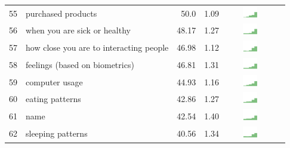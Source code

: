 \begin{table}[t]
\begin{center}
\begin{tabular}{| r | l | r | r | r | r |}
55 & purchased products & 50.0 & 1.09 & \includegraphics[width = 2cm, height = 0.5cm]{tex-inputs/table-images/learnedwhatproductsyoubuycombined} \\ 
56 & when you are sick or healthy & 48.17  & 1.27 & \includegraphics[width = 2cm, height = 0.5cm]{tex-inputs/table-images/learnedwhenyouaresickorhealthycombined} \\ 
57 & how close you are to interacting people & 46.98 & 1.12 & \includegraphics[width = 2cm, height = 0.5cm]{tex-inputs/table-images/learnedhowcloseyouaretootherpeopleyouinteractwithcombined} \\ 
58 & feelings (based on biometrics) & 46.81 & 1.31 & \includegraphics[width = 2cm, height = 0.5cm]{tex-inputs/table-images/learnedhowyouwerefeelingbasedonheartratebreathingandortemperaturecombined} \\ 
59 & computer usage & 44.93 & 1.16 & \includegraphics[width = 2cm, height = 0.5cm]{tex-inputs/table-images/learnedhowmuchyouuseyourcomputercombined} \\ 
60 & eating patterns & 42.86 & 1.27 & \includegraphics[width = 2cm, height = 0.5cm]{tex-inputs/table-images/learnedwhenhowmuchandwhatyouareeatingcombined} \\ 
61 & name & 42.54 & 1.40 & \includegraphics[width = 2cm, height = 0.5cm]{tex-inputs/table-images/learnedyournamecombined} \\ 
62 & sleeping patterns & 40.56 & 1.34 & \includegraphics[width = 2cm, height = 0.5cm]{tex-inputs/table-images/learnedwhenandhowwellyouaresleepingcombined} \\ 

\end{tabular}
\end{center}
\end{table}

